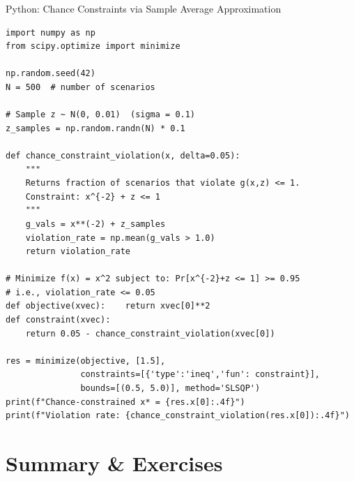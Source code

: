 \documentclass[aspectratio=169,10pt]{beamer}
\begin{document}
\begin{frame}[fragile]{Python: Chance Constraints via Sample Average Approximation}
\begin{lstlisting}
import numpy as np
from scipy.optimize import minimize

np.random.seed(42)
N = 500  # number of scenarios

# Sample z ~ N(0, 0.01)  (sigma = 0.1)
z_samples = np.random.randn(N) * 0.1

def chance_constraint_violation(x, delta=0.05):
    """
    Returns fraction of scenarios that violate g(x,z) <= 1.
    Constraint: x^{-2} + z <= 1
    """
    g_vals = x**(-2) + z_samples
    violation_rate = np.mean(g_vals > 1.0)
    return violation_rate

# Minimize f(x) = x^2 subject to: Pr[x^{-2}+z <= 1] >= 0.95
# i.e., violation_rate <= 0.05
def objective(xvec):    return xvec[0]**2
def constraint(xvec):
    return 0.05 - chance_constraint_violation(xvec[0])

res = minimize(objective, [1.5],
               constraints=[{'type':'ineq','fun': constraint}],
               bounds=[(0.5, 5.0)], method='SLSQP')
print(f"Chance-constrained x* = {res.x[0]:.4f}")
print(f"Violation rate: {chance_constraint_violation(res.x[0]):.4f}")
\end{lstlisting}
\end{frame}

\section{Summary \& Exercises}
\end{document}
